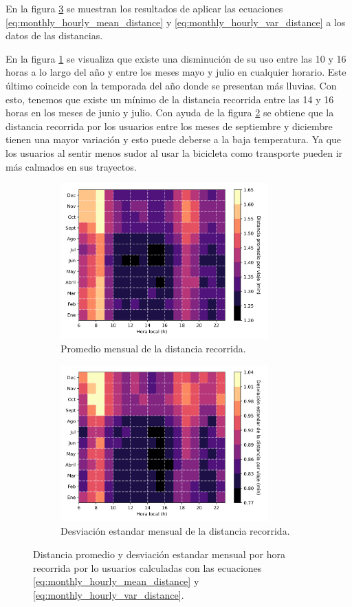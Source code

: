 En la figura \ref{fig:monthly_hourly_distance} se muestran los resultados de aplicar las ecuaciones \ref{eq:monthly_hourly_mean_distance} y \ref{eq:monthly_hourly_var_distance} a los datos de las distancias.

En la figura \ref{fig:monthly_hourly_mean_distance} se visualiza que existe una disminución de su uso entre las 10 y 16 horas a lo largo del año y entre los meses mayo y julio en cualquier horario. Este último coincide con la temporada del año donde se presentan más lluvias\cite{clima_guadalajara}. Con esto, tenemos que existe un mínimo de la distancia recorrida entre las 14 y 16 horas en los meses de junio y julio. Con ayuda de la figura \ref{fig:monthly_hourly_var_distance} se obtiene que la distancia recorrida por los usuarios entre los meses de septiembre y diciembre tienen una mayor variación y esto puede deberse a la baja temperatura\cite{clima_guadalajara}. Ya que los usuarios al sentir menos sudor al usar la bicicleta como transporte pueden ir más calmados en sus trayectos.

\begin{figure}[H]
    \centering
    \begin{subfigure}[b]{8cm}
        \includegraphics[width=8cm]{Graphics/monthly_hourly_mean_distance.png}
        \caption{Promedio mensual de la distancia recorrida.}
        \label{fig:monthly_hourly_mean_distance}
    \end{subfigure}
    \begin{subfigure}[b]{8cm}
        \includegraphics[width=8cm]{Graphics/monthly_hourly_var_distance.png}
        \caption{Desviación estandar mensual de la distancia recorrida.}
        \label{fig:monthly_hourly_var_distance}
    \end{subfigure}
    \caption{Distancia promedio y desviación estandar mensual por hora recorrida por lo usuarios calculadas con las ecuaciones \ref{eq:monthly_hourly_mean_distance} y \ref{eq:monthly_hourly_var_distance}.}
    \label{fig:monthly_hourly_distance}
\end{figure}


